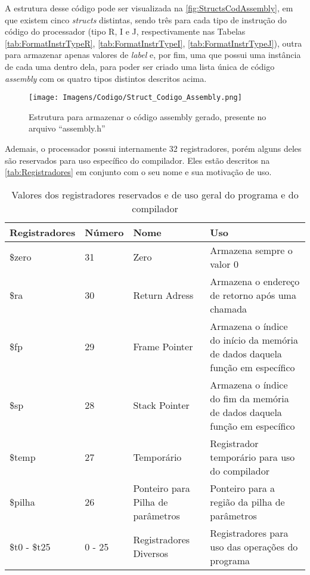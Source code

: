 \documentclass[
	12pt,				%
	oneside,
	a4paper,			%
	english,			%
	french,				%
	spanish,			%
	brazil,				%
	]{abntex2}
\begin{document}
A estrutura desse código pode ser visualizada na \autoref{fig:StructsCodAssembly}, em que existem cinco \emph{structs} distintas, sendo três para cada tipo de instrução do código do processador (tipo R, I e J, respectivamente nas Tabelas \ref{tab:FormatInstrTypeR}, \ref{tab:FormatInstrTypeI}, \ref{tab:FormatInstrTypeJ}), outra para armazenar apenas valores de \emph{label} e, por fim, uma que possui uma instância de cada uma dentro dela, para poder ser criado uma lista única de código \emph{assembly} com os quatro tipos distintos descritos acima.


\begin{figure}[htb]
\centering 
\caption{Estrutura para armazenar o código assembly gerado, presente no arquivo \nohyphens{``assembly.h''}} 
\label{fig:StructsCodAssembly}
\graphicspath{ {./Imagens/} } 
\texttt{[image: Imagens/Codigo/Struct\_Codigo\_Assembly.png]}
\end{figure}

Ademais, o processador possui internamente 32 registradores, porém alguns deles são reservados para uso específico do compilador. Eles estão descritos na \autoref{tab:Registradores} em conjunto com o seu nome e sua motivação de uso.

\begin{table}[htbp]
\centering
\ABNTEXfontereduzida
\caption{Valores dos registradores reservados e de uso geral do programa e do compilador} 
\label{tab:Registradores}
\begin{tabular}{||m{3cm}||m{2cm}||m{3.5cm}||m{5cm}||} 
\hline
\multicolumn{1}{||m{3cm}||}{\centering Registradores} & \multicolumn{1}{m{2cm}||}{\centering Número} & \multicolumn{1}{m{3.5cm}||}{\centering Nome} & \multicolumn{1}{m{5cm}||}{\centering Uso}\\ [0.5ex] 
 \hline \hline
\$zero  & 31 & Zero & Armazena sempre o valor 0 \\ \hline
\$ra   &  30 & Return Adress  & Armazena o endereço de retorno após uma chamada \\ \hline 
\$fp   & 29 & Frame Pointer & Armazena o índice do início da memória de dados daquela função em específico  \\ \hline 
\$sp   & 28 & Stack Pointer &  Armazena o índice do fim da memória de dados daquela função em específico     \\ \hline 
\$temp & 27 & Temporário & Registrador temporário para uso do compilador \\ \hline 
\$pilha  & 26 & Ponteiro para Pilha de parâmetros & Ponteiro para a região da pilha de parâmetros \\ \hline      
\$t0 - \$t25 & 0 - 25 & Registradores Diversos & Registradores para uso das operações do programa \\ \hline 
\end{tabular}
\end{table}
\end{document}
